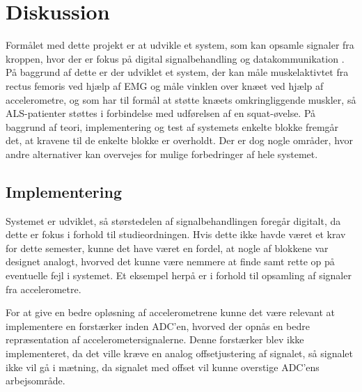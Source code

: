 \section{Diskussion}
Formålet med dette projekt er at udvikle et system, som kan opsamle signaler fra kroppen, hvor der er fokus på digital signalbehandling og datakommunikation \citep{aalborguniversitet2014}. På baggrund af dette er der udviklet et system, der kan måle muskelaktivtet fra rectus femoris ved hjælp af EMG og måle vinklen over knæet ved hjælp af accelerometre, og som har til formål at støtte knæets omkringliggende muskler, så ALS-patienter støttes i forbindelse med udførelsen af en squat-øvelse. På baggrund af teori, implementering og test af systemets enkelte blokke fremgår det, at kravene til de enkelte blokke er overholdt. Der er dog nogle områder, hvor andre alternativer kan overvejes for mulige forbedringer af hele systemet. 

\subsection{Implementering}
Systemet er udviklet, så størstedelen af signalbehandlingen foregår digitalt, da dette er fokus i forhold til studieordningen. Hvis dette ikke havde været et krav for dette semester, kunne det have været en fordel, at nogle af blokkene var designet analogt, hvorved det kunne være nemmere at finde samt rette op på eventuelle fejl i systemet. Et eksempel herpå er i forhold til opsamling af signaler fra accelerometre. 

For at give en bedre opløsning af accelerometrene kunne det være relevant at implementere en forstærker inden ADC'en, hvorved der opnås en bedre repræsentation af accelerometersignalerne. Denne forstærker blev ikke implementeret, da det ville kræve en analog offsetjustering af signalet, så signalet ikke vil gå i mætning, da signalet med offset vil kunne overstige ADC'ens arbejsområde. %


